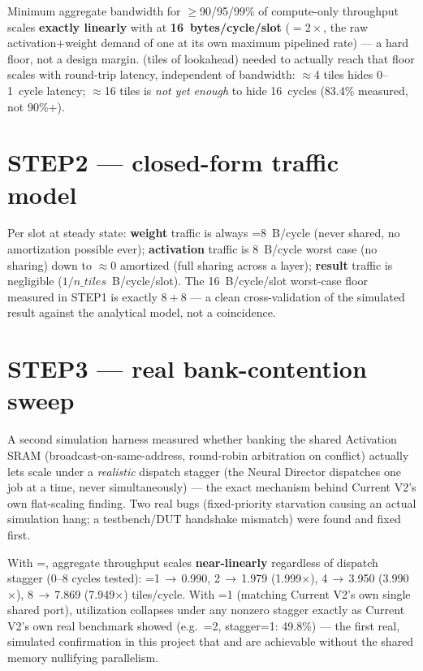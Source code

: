 \begin{fnnote}
Minimum aggregate bandwidth for $\ge$90/95/99\% of compute-only
throughput scales \textbf{exactly linearly} with  at
\textbf{16~bytes/cycle/slot} ($=2\times$, the raw
activation+weight demand of one  at its own
maximum pipelined rate) --- a hard floor, not a design margin.
 (tiles of lookahead) needed to actually reach
that floor scales with round-trip latency, independent of bandwidth:
$\approx$4 tiles hides 0--1~cycle latency; $\approx$16 tiles is
\emph{not yet enough} to hide 16~cycles (83.4\% measured, not 90\%+).
\end{fnnote}

\section{STEP2 --- closed-form traffic model}
Per slot at steady state: \textbf{weight} traffic is always
=8~B/cycle (never shared, no amortization possible ever);
\textbf{activation} traffic is 8~B/cycle worst case (no sharing) down
to $\approx$0 amortized (full sharing across a layer); \textbf{result}
traffic is negligible ($1/n\_tiles$~B/cycle/slot). The 16~B/cycle/slot
worst-case floor measured in STEP1 is exactly $8+8$ --- a clean
cross-validation of the simulated result against the analytical model,
not a coincidence.

\section{STEP3 --- real bank-contention sweep}
\label{sec:nmsstep3}
A second simulation harness measured whether banking the shared
Activation SRAM (broadcast-on-same-address, round-robin arbitration on
conflict) actually lets  scale under a \emph{realistic}
dispatch stagger (the Neural Director dispatches one job at a time,
never simultaneously) --- the exact mechanism behind Current V2's own
flat-scaling finding. Two real bugs (fixed-priority starvation causing
an actual simulation hang; a testbench/DUT handshake mismatch) were
found and fixed first.

\begin{fnnote}
With =, aggregate throughput scales
\textbf{near-linearly} regardless of dispatch stagger (0--8 cycles
tested): =1\,$\to$\,0.990, 2\,$\to$\,1.979 (1.999$\times$),
4\,$\to$\,3.950 (3.990$\times$), 8\,$\to$\,7.869 (7.949$\times$)
tiles/cycle. With =1 (matching Current V2's own single
shared port), utilization collapses under any nonzero stagger exactly
as Current V2's own real benchmark showed (e.g.\ =2,
stagger=1: 49.8\%) --- the first real, simulated confirmation in this
project that  and  are achievable without
the shared memory nullifying parallelism.
\end{fnnote}

